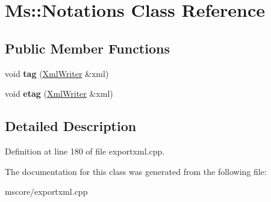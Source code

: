 \hypertarget{class_ms_1_1_notations}{}\section{Ms\+:\+:Notations Class Reference}
\label{class_ms_1_1_notations}
\subsection*{Public Member Functions}
\begin{DoxyCompactItemize}
\item 
\mbox{\label{class_ms_1_1_notations_a0b7e5dfe559118c2b0ba69b82b363b58}} 
void {\bfseries tag} (\hyperlink{class_ms_1_1_xml_writer}{Xml\+Writer} \&xml)
\item 
\mbox{\label{class_ms_1_1_notations_a9a50d3a9c70284ef6ac2692125c10848}} 
void {\bfseries etag} (\hyperlink{class_ms_1_1_xml_writer}{Xml\+Writer} \&xml)
\end{DoxyCompactItemize}


\subsection{Detailed Description}


Definition at line 180 of file exportxml.\+cpp.



The documentation for this class was generated from the following file\+:\begin{DoxyCompactItemize}
\item 
mscore/exportxml.\+cpp\end{DoxyCompactItemize}
